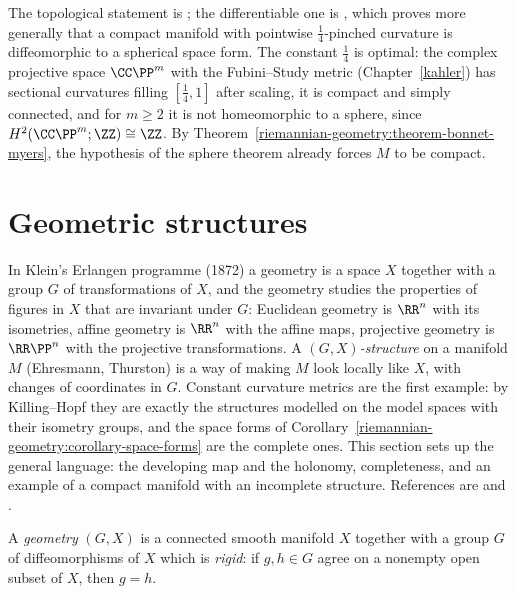 The topological statement is \cite[Chapter 13]{do-carmo-riemannian}; the differentiable one is \cite{brendle-schoen-2009}, which proves more generally that a compact
manifold with pointwise $\frac14$-pinched curvature is diffeomorphic to a spherical space form. The constant $\frac14$ is optimal: the complex projective space $\CC\PP^m$
with the Fubini--Study metric (Chapter~\ref{kahler}) has sectional curvatures filling $[\frac14, 1]$ after scaling, it is compact and simply connected, and for $m \geq 2$
it is not homeomorphic to a sphere, since $H^2(\CC\PP^m; \ZZ) \cong \ZZ$. By Theorem~\ref{riemannian-geometry:theorem-bonnet-myers}, the hypothesis of the sphere theorem
already forces $M$ to be compact.

\section{Geometric structures}\label{riemannian-geometry:section-geometric-structures}

In Klein's Erlangen programme (1872) a geometry is a space $X$ together with a group $G$ of transformations of $X$, and the geometry studies the properties of figures in $X$ that are invariant under $G$:
Euclidean geometry is $\RR^n$ with its isometries, affine geometry is $\RR^n$ with the affine maps, projective geometry is $\RR\PP^n$ with the projective transformations. A \emph{$(G, X)$-structure} on a manifold
$M$ (Ehresmann, Thurston) is a way of making $M$ look locally like $X$, with changes of coordinates in $G$. Constant curvature metrics are the first example: by Killing--Hopf they are exactly the structures modelled on
the model spaces with their isometry groups, and the space forms of Corollary~\ref{riemannian-geometry:corollary-space-forms} are the complete ones. This section sets up the general language: the developing map and
the holonomy, completeness, and an example of a compact manifold with an incomplete structure. References are \cite[Chapter 3]{thurston-1997} and \cite{goldman-2022}.

\begin{definition}\label{riemannian-geometry:definition-geometry}
A \emph{geometry} $(G, X)$ is a connected smooth manifold $X$ together with a group $G$ of diffeomorphisms of $X$ which is \emph{rigid}: if $g, h \in G$ agree on a nonempty open subset of $X$, then $g = h$.
\end{definition}

